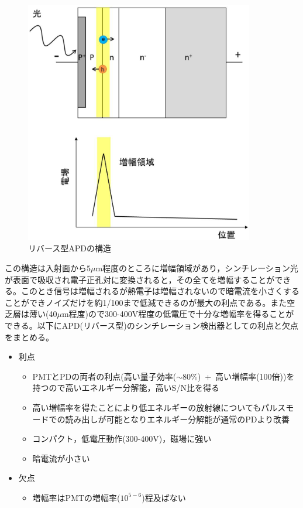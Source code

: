 \begin{figure}[H]
 \begin{center}
 \includegraphics[width=10cm]{image/other/reverce.eps}
 \end{center}
 \caption{リバース型APDの構造\cite{kataoka_web}}
 \label{fig:reverce}
\end{figure}

この構造は入射面から$5\mu$m程度のところに増幅領域があり，シンチレーション光が表面で吸収され電子正孔対に変換されると，その全てを増幅することができる。このとき信号は増幅されるが熱電子は増幅されないので暗電流を小さくすることができノイズだけを約1/100まで低減できるのが最大の利点である。また空乏層は薄い(40$\mu$m程度)ので300-400V程度の低電圧で十分な増幅率を得ることができる。以下にAPD(リバース型)のシンチレーション検出器としての利点と欠点をまとめる。
\begin{itemize}
\item 利点
\begin{itemize}
\item PMTとPDの両者の利点(高い量子効率($\sim80\%$)\ +\ 高い増幅率(100倍))を持つので高いエネルギー分解能，高いS/N比を得る
\item 高い増幅率を得たことにより低エネルギーの放射線についてもパルスモードでの読み出しが可能となりエネルギー分解能が通常のPDより改善
\item コンパクト，低電圧動作(300-400V)，磁場に強い
\item 暗電流が小さい
\end{itemize}

\item 欠点
\begin{itemize}
\item 増幅率はPMTの増幅率($10^{5-6}$)程及ばない
\end{itemize}

\end{itemize}


